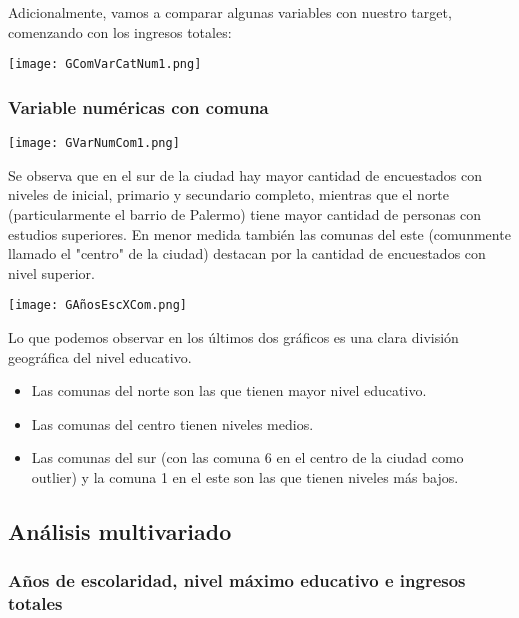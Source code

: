 \documentclass[a4paper]{article}
\begin{document}
        Adicionalmente, vamos a comparar algunas variables con nuestro target, comenzando con los ingresos totales:

        \texttt{[image: GComVarCatNum1.png]}
        
        \subsubsection{Variable numéricas con comuna}
        
        \texttt{[image: GVarNumCom1.png]}
        
        Se observa que en el sur de la ciudad hay mayor cantidad de encuestados con niveles de inicial, primario y secundario completo, mientras que el norte (particularmente el barrio de Palermo) tiene mayor cantidad de personas con estudios superiores. En menor medida también las comunas del este (comunmente llamado el "centro" de la ciudad) destacan por la cantidad de encuestados con nivel superior.
        
        \begin{center}
            \texttt{[image: GAñosEscXCom.png]}
        \end{center}

        Lo que podemos observar en los últimos dos gráficos es una clara división geográfica del nivel educativo.
        \begin{itemize}
            \item Las comunas del norte son las que tienen mayor nivel educativo.
            \item Las comunas del centro tienen niveles medios.
            \item Las comunas del sur (con las comuna 6 en el centro de la ciudad como outlier) y la comuna 1 en el este son las que tienen niveles más bajos.
        \end{itemize}
    
    \newpage
    
    \subsection{Análisis multivariado}
        
        \subsubsection*{Años de escolaridad, nivel máximo educativo e ingresos totales}
\end{document}
